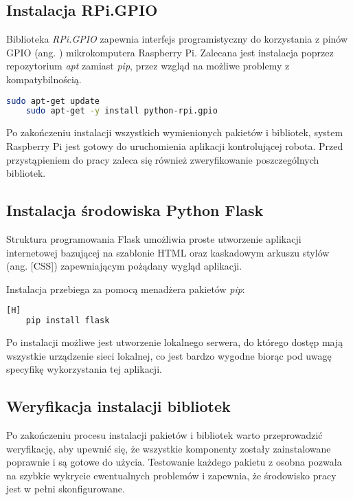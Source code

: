 \subsection{Instalacja RPi.GPIO}
Biblioteka \textit{RPi.GPIO} zapewnia interfejs programistyczny do korzystania z pinów GPIO (ang. ) mikrokomputera Raspberry Pi. Zalecana jest instalacja poprzez repozytorium \textit{apt} zamiast \textit{pip}, przez wzgląd na możliwe problemy z kompatybilnością.

\begin{lstlisting}[language=bash]
    sudo apt-get update
    sudo apt-get -y install python-rpi.gpio
\end{lstlisting}

\vspace*{1cm}

Po zakończeniu instalacji wszystkich wymienionych pakietów i bibliotek, system Raspberry Pi jest gotowy do uruchomienia aplikacji kontrolującej robota. Przed przystąpieniem do pracy zaleca się również zweryfikowanie poszczególnych bibliotek.

\subsection{Instalacja środowiska Python Flask}

Struktura programowania Flask umożliwia proste utworzenie aplikacji internetowej bazującej na szablonie HTML oraz kaskadowym arkuszu stylów (ang.  [CSS]) zapewniającym pożądany wygląd aplikacji. 

Instalacja przebiega za pomocą menadżera pakietów \textit{pip}:

\begin{lstlisting}[language=bash][H]
    pip install flask
\end{lstlisting}

Po instalacji możliwe jest utworzenie lokalnego serwera, do którego dostęp mają wszystkie urządzenie sieci lokalnej, co jest bardzo wygodne biorąc pod uwagę specyfikę wykorzystania tej aplikacji. 

\subsection{Weryfikacja instalacji bibliotek}

Po zakończeniu procesu instalacji pakietów i bibliotek warto przeprowadzić weryfikację, aby upewnić się, że wszystkie komponenty zostały zainstalowane poprawnie i są gotowe do użycia. Testowanie każdego pakietu z osobna pozwala na szybkie wykrycie ewentualnych problemów i zapewnia, że środowisko pracy jest w pełni skonfigurowane.

